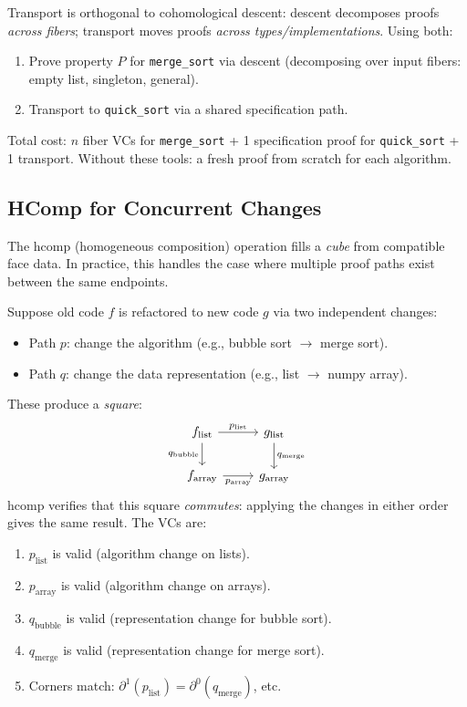 Transport is orthogonal to cohomological descent: descent decomposes
proofs \emph{across fibers}; transport moves proofs
\emph{across types/implementations}.  Using both:
\begin{enumerate}
\item Prove property $P$ for \texttt{merge\_sort} via descent
  (decomposing over input fibers: empty list, singleton, general).
\item Transport to \texttt{quick\_sort} via a shared specification
  path.
\end{enumerate}
Total cost: $n$ fiber VCs for \texttt{merge\_sort} +
1 specification proof for \texttt{quick\_sort} +
1 transport.  Without these tools: a fresh proof from scratch
for each algorithm.


\subsection{HComp for Concurrent Changes}
\label{sec:hcomp-concurrent}

The \textsf{hcomp} (homogeneous composition) operation fills a
\emph{cube} from compatible face data.  In practice, this handles
the case where multiple proof paths exist between the same endpoints.

\begin{example}
\label{ex:refactoring}
Suppose old code $f$ is refactored to new code $g$ via two
independent changes:
\begin{itemize}
\item Path $p$: change the algorithm (e.g., bubble sort $\to$
  merge sort).
\item Path $q$: change the data representation (e.g., list $\to$
  numpy array).
\end{itemize}
These produce a \emph{square}:
\[
\begin{tikzcd}
  f_{\mathrm{list}} \ar[r, "p_{\mathrm{list}}"]
    \ar[d, "q_{\mathrm{bubble}}"']
    & g_{\mathrm{list}} \ar[d, "q_{\mathrm{merge}}"] \\
  f_{\mathrm{array}} \ar[r, "p_{\mathrm{array}}"']
    & g_{\mathrm{array}}
\end{tikzcd}
\]
\textsf{hcomp} verifies that this square \emph{commutes}: applying
the changes in either order gives the same result.  The VCs are:
\begin{enumerate}
\item $p_\mathrm{list}$ is valid (algorithm change on lists).
\item $p_\mathrm{array}$ is valid (algorithm change on arrays).
\item $q_\mathrm{bubble}$ is valid (representation change for
  bubble sort).
\item $q_\mathrm{merge}$ is valid (representation change for
  merge sort).
\item Corners match: $\partial^1(p_\mathrm{list}) =
  \partial^0(q_\mathrm{merge})$, etc.
\end{enumerate}
\end{example}


